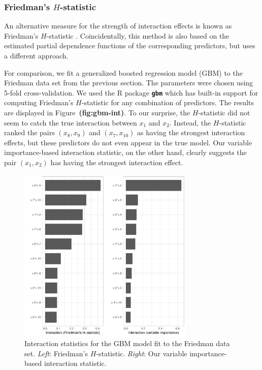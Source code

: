 \documentclass[12pt]{article}
\newcommand{\pkg}[1]{\texorpdfstring%
{{\normalfont\fontseries{b}\selectfont #1}}%
{#1}}
\def\pkg#1{\textbf{\texttt{#1}}}
\def\ref#1{\textbf{(#1)}}
\begin{document}
\subsubsection{Friedman's $H$-statistic}

An alternative measure for the strength of interaction effects is known as Friedman's $H$-statistic \citep{friedman-2008-predictive}. Coincidentally, this method is also based on the estimated partial dependence functions of the corresponding predictors, but uses a different approach.

For comparison, we fit a generalized boosted regression model (GBM) to the Friedman data set from the previous section. The parameters were chosen using 5-fold cross-validation. We used the R package \pkg{gbm} \citep{gbm-pkg} which has built-in support for computing Friedman's $H$-statistic for any combination of predictors. The results are displayed in Figure~\ref{fig:gbm-int}. To our surprise, the $H$-statistic did not seem to catch the true interaction between $x_1$ and $x_2$. Instead, the $H$-statistic ranked the pairs $\left(x_8, x_9\right)$ and $\left(x_7, x_{10}\right)$ as having the strongest interaction effects, but these predictors do not even appear in the true model. Our variable importance-based interaction statistic, on the other hand, clearly suggests the pair $\left(x_1, x_2\right)$ has having the strongest interaction effect.

\begin{figure}[!htb]
  \centering
  \includegraphics[width=0.75\textwidth]{gbm-int}
  \caption{Interaction statistics for the GBM model fit to the Friedman data set. \textit{Left}: Friedman's $H$-statistic. \textit{Right}: Our variable importance-based interaction statistic. \label{fig:gbm-int}}
\end{figure}
\end{document}
